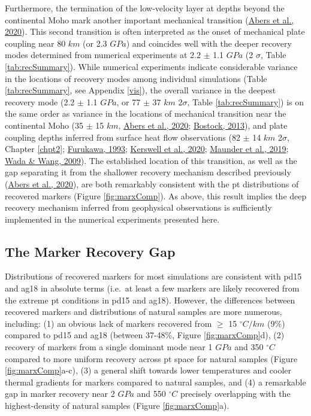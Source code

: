Furthermore, the termination of the low-velocity layer at depths beyond the continental Moho mark another important mechanical transition (\protect\hyperlink{ref-abers2020}{Abers et al., 2020}). This second transition is often interpreted as the onset of mechanical plate coupling near 80 \(km\) (or 2.3 \(GPa\)) and coincides well with the deeper recovery modes determined from numerical experiments at 2.2 \(\pm\) 1.1 \(GPa\) (2 \(\sigma\), Table \ref{tab:recSummary}). While numerical experiments indicate considerable variance in the locations of recovery modes among individual simulations (Table \ref{tab:recSummary}, see Appendix \ref{vis}), the overall variance in the deepest recovery mode (2.2 \(\pm\) 1.1 \(GPa\), or 77 \(\pm\) 37 \(km\) 2\(\sigma\), Table \ref{tab:recSummary}) is on the same order as variance in the locations of mechanical transition near the continental Moho (35 \(\pm\) 15 \(km\), \protect\hyperlink{ref-abers2020}{Abers et al., 2020}; \protect\hyperlink{ref-bostock2013}{Bostock, 2013}), and plate coupling depths inferred from surface heat flow observations (82 \(\pm\) 14 \(km\) 2\(\sigma\), Chapter \ref{chpt2}; \protect\hyperlink{ref-furukawa1993}{Furukawa, 1993}; \protect\hyperlink{ref-kerswell2020}{Kerswell et al., 2020}; \protect\hyperlink{ref-maunder2019}{Maunder et al., 2019}; \protect\hyperlink{ref-wada2009}{Wada \& Wang, 2009}). The established location of this transition, as well as the gap separating it from the shallower recovery mechanism described previously (\protect\hyperlink{ref-abers2020}{Abers et al., 2020}), are both remarkably consistent with the \gls{pt} distributions of recovered markers (Figure \ref{fig:marxComp}). As above, this result implies the deep recovery mechanism inferred from geophysical observations is sufficiently implemented in the numerical experiments presented here.

\hypertarget{the-marker-recovery-gap}{%
\subsection{The Marker Recovery Gap}\label{the-marker-recovery-gap}}

Distributions of recovered markers for most simulations are consistent with pd15 and ag18 in absolute terms (i.e.~at least a few markers are likely recovered from the extreme \gls{pt} conditions in pd15 and ag18). However, the differences between recovered markers and distributions of natural samples are more numerous, including: (1) an obvious lack of markers recovered from \(\geq\) 15 \(^\circ C/km\) (9\%) compared to pd15 and ag18 (between 37-48\%, Figure \ref{fig:marxComp}d), (2) recovery of markers from a single dominant mode near 1 \(GPa\) and 350 \(^\circ C\) compared to more uniform recovery across \gls{pt} space for natural samples (Figure \ref{fig:marxComp}a-c), (3) a general shift towards lower temperatures and cooler thermal gradients for markers compared to natural samples, and (4) a remarkable gap in marker recovery near 2 \(GPa\) and 550 \(^\circ C\) precisely overlapping with the highest-density of natural samples (Figure \ref{fig:marxComp}a).

